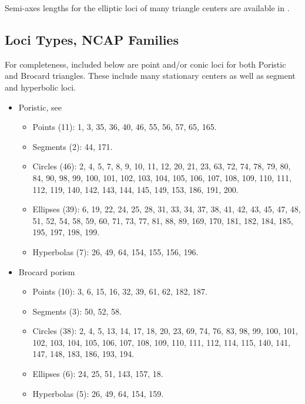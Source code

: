 Semi-axes lengths for the elliptic loci of many triangle centers are available in \cite{garcia2021-ellipses-web}.

\subsection{Loci Types, NCAP Families}
\label{sec:06-ncap-loci}

For completeness, included below are point and/or conic loci for both Poristic and Brocard triangles. These include many stationary centers as well as segment and hyperbolic loci. 

\begin{itemize}
\item Poristic, see \cite{odehnal2011-poristic}
    \begin{itemize}
    \item Points (11): 1, 3, 35, 36, 40, 46, 55, 56, 57, 65, 165. 
    \item Segments (2): 44, 171.
    \item Circles (46): 2, 4, 5, 7, 8, 9, 10, 11, 12, 20, 21, 23, 63, 72, 74, 78, 79, 80, 84, 90, 98, 99, 100, 101, 102, 103, 104, 105, 106, 107, 108, 109, 110, 111, 112, 119, 140, 142, 143, 144, 145, 149, 153, 186, 191, 200.
	\item Ellipses (39): 6, 19, 22, 24, 25, 28, 31, 33, 34, 37, 38, 41, 42, 43, 45, 47, 48, 51, 52, 54, 58, 59, 60, 71, 73, 77, 81, 88, 89, 169, 170, 181, 182, 184, 185, 195, 197, 198, 199.
	\item Hyperbolas (7): 26, 49, 64, 154, 155, 156, 196.
	\end{itemize}
\item{Brocard porism}
    \begin{itemize}
    \item Points (10): 3, 6, 15, 16, 32, 39, 61, 62, 182, 187.
    \item Segments (3): 50, 52, 58.
	\item Circles (38): 2, 4, 5, 13, 14, 17, 18, 20, 23, 69, 74, 76, 83, 98, 99, 100, 101, 102, 103, 104, 105, 106, 107, 108, 109, 110, 111, 112, 114, 115, 140, 141, 147, 148, 183, 186, 193, 194.
	\item Ellipses (6): 24, 25, 51, 143, 157, 18.
	\item Hyperbolas (5): 26, 49, 64, 154, 159.
	\end{itemize}
\end{itemize}


